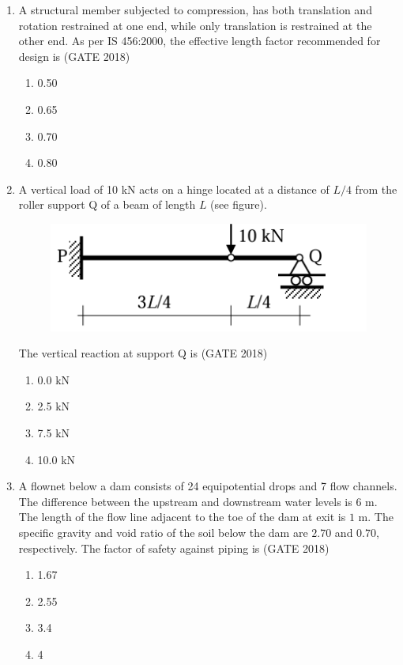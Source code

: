 \documentclass[journal,12pt,onecolumn]{IEEEtran}
\theoremstyle{remark}
\begin{document}
\begin{enumerate}
\vspace{1cm}

\item A structural member subjected to compression, has both translation and rotation restrained at one end, while only translation is restrained at the other end. As per IS 456:2000, the effective length factor recommended for design is
\hfill{(GATE 2018)}
\begin{multicols}{4}
\begin{enumerate}
    \item 0.50
    \item 0.65
    \item 0.70
    \item 0.80
\end{enumerate}
\end{multicols}
\vspace{1cm}
\newpage
\item A vertical load of 10 kN acts on a hinge located at a distance of $L/4$ from the roller support Q of a beam of length $L$ (see figure).
\begin{figure}[h]
    \centering
    \includegraphics[width=0.5\linewidth]{GATE-CE-2018/7-2.png}
    \caption{}
    \label{7-2}
\end{figure}
The vertical reaction at support Q is
\hfill{(GATE 2018)}
\begin{multicols}{4}
\begin{enumerate}
    \item 0.0 kN
    \item 2.5 kN
    \item 7.5 kN
    \item 10.0 kN
\end{enumerate}
\end{multicols}
\vspace{1cm}

\item A flownet below a dam consists of 24 equipotential drops and 7 flow channels. The difference between the upstream and downstream water levels is $6$ m. The length of the flow line adjacent to the toe of the dam at exit is $1$ m. The specific gravity and void ratio of the soil below the dam are $2.70$ and $0.70$, respectively. The factor of safety against piping is
\hfill{(GATE 2018)}
\begin{multicols}{4}
\begin{enumerate}
    \item 1.67
    \item 2.55
    \item 3.4
    \item 4
\end{enumerate}
\end{multicols}
\vspace{1cm}


\end{enumerate}
\end{document}
